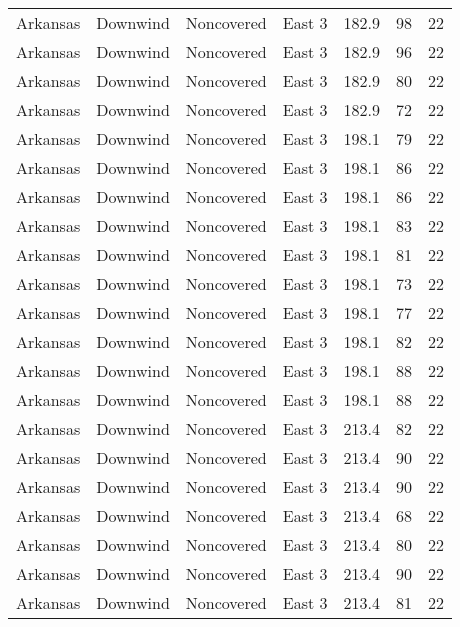 \documentclass{article}
\begin{document}
\begin{longtable}[H]{ccccccc}
Arkansas & Downwind  & Noncovered & East 3        & 182.9        & 98          & 22  \\
Arkansas & Downwind  & Noncovered & East 3        & 182.9        & 96          & 22  \\
Arkansas & Downwind  & Noncovered & East 3        & 182.9        & 80          & 22  \\
Arkansas & Downwind  & Noncovered & East 3        & 182.9        & 72          & 22  \\
Arkansas & Downwind  & Noncovered & East 3        & 198.1        & 79          & 22  \\
Arkansas & Downwind  & Noncovered & East 3        & 198.1        & 86          & 22  \\
Arkansas & Downwind  & Noncovered & East 3        & 198.1        & 86          & 22  \\
Arkansas & Downwind  & Noncovered & East 3        & 198.1        & 83          & 22  \\
Arkansas & Downwind  & Noncovered & East 3        & 198.1        & 81          & 22  \\
Arkansas & Downwind  & Noncovered & East 3        & 198.1        & 73          & 22  \\
Arkansas & Downwind  & Noncovered & East 3        & 198.1        & 77          & 22  \\
Arkansas & Downwind  & Noncovered & East 3        & 198.1        & 82          & 22  \\
Arkansas & Downwind  & Noncovered & East 3        & 198.1        & 88          & 22  \\
Arkansas & Downwind  & Noncovered & East 3        & 198.1        & 88          & 22  \\
Arkansas & Downwind  & Noncovered & East 3        & 213.4        & 82          & 22  \\
Arkansas & Downwind  & Noncovered & East 3        & 213.4        & 90          & 22  \\
Arkansas & Downwind  & Noncovered & East 3        & 213.4        & 90          & 22  \\
Arkansas & Downwind  & Noncovered & East 3        & 213.4        & 68          & 22  \\
Arkansas & Downwind  & Noncovered & East 3        & 213.4        & 80          & 22  \\
Arkansas & Downwind  & Noncovered & East 3        & 213.4        & 90          & 22  \\
Arkansas & Downwind  & Noncovered & East 3        & 213.4        & 81          & 22  \\

\end{longtable}
\end{document}
